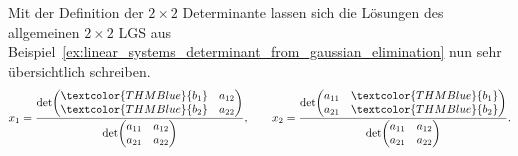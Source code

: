 \begin{samepage}
Mit der Definition der $2\times2$ Determinante lassen sich die Lösungen des allgemeinen
$2\times2$ LGS aus Beispiel~\ref{ex:linear_systems_determinant_from_gaussian_elimination}
nun sehr übersichtlich schreiben.
\[
  x_1=
  \frac{
    \det\!\begin{pmatrix}
      \textcolor{THMBlue}{b_1}&a_{12}\\
      \textcolor{THMBlue}{b_2}&a_{22}
    \end{pmatrix}
  }{
    \det\!\begin{pmatrix}a_{11}&a_{12}\\a_{21}&a_{22}\end{pmatrix}
  },
  \qquad
  x_2=
  \frac{
    \det\!\begin{pmatrix}
      a_{11}&\textcolor{THMBlue}{b_1}\\
      a_{21}&\textcolor{THMBlue}{b_2}
    \end{pmatrix}
  }{
    \det\!\begin{pmatrix}a_{11}&a_{12}\\a_{21}&a_{22}\end{pmatrix}
  }.
\]
\end{samepage}
